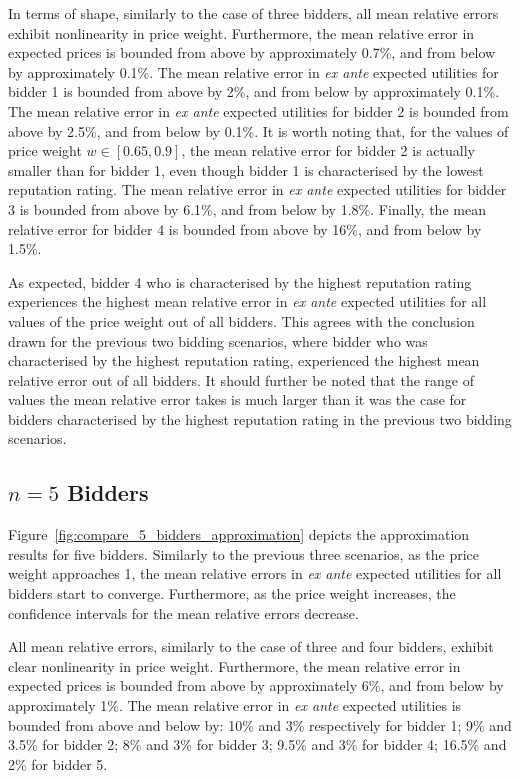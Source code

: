 In terms of shape, similarly to the case of three bidders, all mean relative errors exhibit nonlinearity in price weight. Furthermore, the mean relative error in expected prices is bounded from above by approximately 0.7\%, and from below by approximately 0.1\%. The mean relative error in \emph{ex ante} expected utilities for bidder 1 is bounded from above by 2\%, and from below by approximately 0.1\%. The mean relative error in \emph{ex ante} expected utilities for bidder 2 is bounded from above by 2.5\%, and from below by 0.1\%. It is worth noting that, for the values of price weight $w\in [0.65, 0.9]$, the mean relative error for bidder 2 is actually smaller than for bidder 1, even though bidder 1 is characterised by the lowest reputation rating. The mean relative error in \emph{ex ante} expected utilities for bidder 3 is bounded from above by 6.1\%, and from below by 1.8\%. Finally, the mean relative error for bidder 4 is bounded from above by 16\%, and from below by 1.5\%.

As expected, bidder 4 who is characterised by the highest reputation rating experiences the highest mean relative error in \emph{ex ante} expected utilities for all values of the price weight out of all bidders. This agrees with the conclusion drawn for the previous two bidding scenarios, where bidder who was characterised by the highest reputation rating, experienced the highest mean relative error out of all bidders. It should further be noted that the range of values the mean relative error takes is much larger than it was the case for bidders characterised by the highest reputation rating in the previous two bidding scenarios.

\subsection{$n=5$ Bidders} %
\label{sub:n_5_bidders_approximation}
Figure~\ref{fig:compare_5_bidders_approximation} depicts the approximation results for five bidders. Similarly to the previous three scenarios, as the price weight approaches 1, the mean relative errors in \emph{ex ante} expected utilities for all bidders start to converge. Furthermore, as the price weight increases, the confidence intervals for the mean relative errors decrease.

All mean relative errors, similarly to the case of three and four bidders, exhibit clear nonlinearity in price weight. Furthermore, the mean relative error in expected prices is bounded from above by approximately 6\%, and from below by approximately 1\%. The mean relative error in \emph{ex ante} expected utilities is bounded from above and below by: 10\% and 3\% respectively for bidder 1; 9\% and 3.5\% for bidder 2; 8\% and 3\% for bidder 3; 9.5\% and 3\% for bidder 4; 16.5\% and 2\% for bidder 5.


